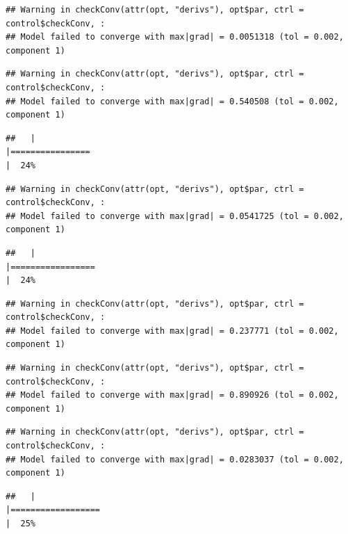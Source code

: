 \documentclass[
  12pt,
]{book}
\begin{document}
\begin{verbatim}
## Warning in checkConv(attr(opt, "derivs"), opt$par, ctrl = control$checkConv, :
## Model failed to converge with max|grad| = 0.0051318 (tol = 0.002, component 1)
\end{verbatim}

\begin{verbatim}
## Warning in checkConv(attr(opt, "derivs"), opt$par, ctrl = control$checkConv, :
## Model failed to converge with max|grad| = 0.540508 (tol = 0.002, component 1)
\end{verbatim}

\begin{verbatim}
##   |                                                                              |================                                                      |  24%
\end{verbatim}

\begin{verbatim}
## Warning in checkConv(attr(opt, "derivs"), opt$par, ctrl = control$checkConv, :
## Model failed to converge with max|grad| = 0.0541725 (tol = 0.002, component 1)
\end{verbatim}

\begin{verbatim}
##   |                                                                              |=================                                                     |  24%
\end{verbatim}

\begin{verbatim}
## Warning in checkConv(attr(opt, "derivs"), opt$par, ctrl = control$checkConv, :
## Model failed to converge with max|grad| = 0.237771 (tol = 0.002, component 1)
\end{verbatim}

\begin{verbatim}
## Warning in checkConv(attr(opt, "derivs"), opt$par, ctrl = control$checkConv, :
## Model failed to converge with max|grad| = 0.890926 (tol = 0.002, component 1)
\end{verbatim}

\begin{verbatim}
## Warning in checkConv(attr(opt, "derivs"), opt$par, ctrl = control$checkConv, :
## Model failed to converge with max|grad| = 0.0283037 (tol = 0.002, component 1)
\end{verbatim}

\begin{verbatim}
##   |                                                                              |==================                                                    |  25%
\end{verbatim}
\end{document}
